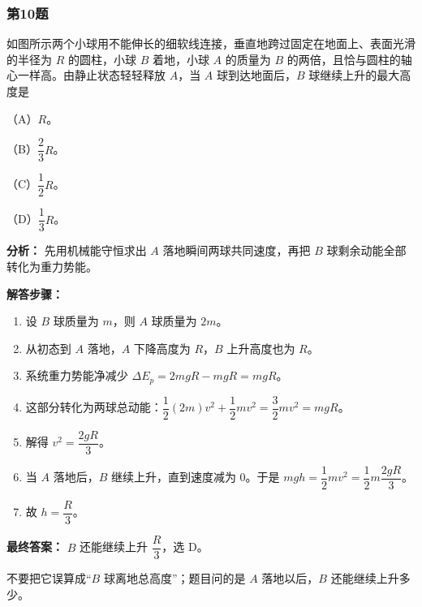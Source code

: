 \documentclass[12pt,a4paper]{ctexart}
\begin{document}
\subsubsection*{第10题}
\begin{tcolorbox}[colback=gray!2!white,colframe=black!60,title={题目}]
如图所示两个小球用不能伸长的细软线连接，垂直地跨过固定在地面上、表面光滑的半径为 \(R\) 的圆柱，小球 \(B\) 着地，小球 \(A\) 的质量为 \(B\) 的两倍，且恰与圆柱的轴心一样高。由静止状态轻轻释放 \(A\)，当 \(A\) 球到达地面后，\(B\) 球继续上升的最大高度是\par
（A）\(R\)。\par
（B）\(\dfrac{2}{3}R\)。\par
（C）\(\dfrac{1}{2}R\)。\par
（D）\(\dfrac{1}{3}R\)。\par
\end{tcolorbox}
\begin{tcolorbox}[colback=blue!2!white,colframe=blue!55!black,title={完整答案}]
\textbf{分析：}
先用机械能守恒求出 \(A\) 落地瞬间两球共同速度，再把 \(B\) 球剩余动能全部转化为重力势能。\par
\textbf{解答步骤：}
\begin{enumerate}
\item 设 \(B\) 球质量为 \(m\)，则 \(A\) 球质量为 \(2m\)。
\item 从初态到 \(A\) 落地，\(A\) 下降高度为 \(R\)，\(B\) 上升高度也为 \(R\)。
\item 系统重力势能净减少 \(\Delta E_p=2mgR-mgR=mgR\)。
\item 这部分转化为两球总动能：\(\dfrac12 (2m)v^2+\dfrac12 mv^2=\dfrac32 mv^2=mgR\)。
\item 解得 \(v^2=\dfrac{2gR}{3}\)。
\item 当 \(A\) 落地后，\(B\) 继续上升，直到速度减为 0。于是 \(mgh=\dfrac12 mv^2=\dfrac12 m\dfrac{2gR}{3}\)。
\item 故 \(h=\dfrac{R}{3}\)。
\end{enumerate}
\textbf{最终答案：}
\(B\) 还能继续上升 \(\dfrac{R}{3}\)，选 D。\par
\end{tcolorbox}
\begin{tcolorbox}[colback=red!2!white,colframe=red!55!black,title={易错点}]
不要把它误算成“\(B\) 球离地总高度”；题目问的是 \(A\) 落地以后，\(B\) 还能继续上升多少。\par
\end{tcolorbox}
\end{document}
